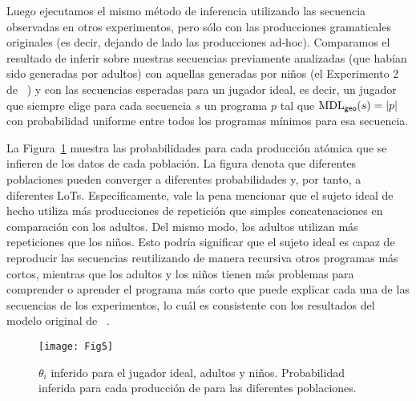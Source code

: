 Luego ejecutamos el mismo método de inferencia utilizando las secuencia observadas en otros experimentos, pero sólo con las producciones gramaticales originales (es decir, dejando de lado las producciones ad-hoc). Comparamos el resultado de inferir sobre nuestras secuencias previamente analizadas (que habían sido generadas por adultos) con aquellas generadas por niños (el Experimento 2 de  ~\cite{amalric2017language}) y con las secuencias esperadas para un jugador ideal, es decir, un jugador que siempre elige para cada secuencia $s$ un programa $p$ tal que ${\rm MDL}_{{\sf geo}}(s) = |p|$ con probabilidad uniforme entre todos los programas mínimos para esa secuencia.


La Figura~\ref{fig:adultVsChildren} muestra las probabilidades para cada producción atómica que se infieren de los datos de cada población. La figura denota que diferentes poblaciones pueden converger a diferentes probabilidades y, por tanto, a diferentes LoTs. Específicamente, vale la pena mencionar que el sujeto ideal de hecho utiliza más producciones de repetición que simples concatenaciones en comparación con los adultos. Del mismo modo, los adultos utilizan más repeticiones que los niños. Esto podría significar que el sujeto ideal es capaz de reproducir las secuencias reutilizando de manera recursiva otros programas más cortos, mientras que los adultos y los niños tienen más problemas para comprender o aprender el programa más corto que puede explicar cada una de las secuencias de los experimentos, lo cuál es consistente con los resultados del modelo original de ~\cite{amalric2017language}.

\begin{figure}[!ht]
    \centering
    \texttt{[image: Fig5]}
    \caption{$\theta_i$ inferido para el jugador ideal, adultos y niños. Probabilidad inferida para cada producción de \gramgeo para las diferentes poblaciones.}
    \label{fig:adultVsChildren}
\end{figure}

